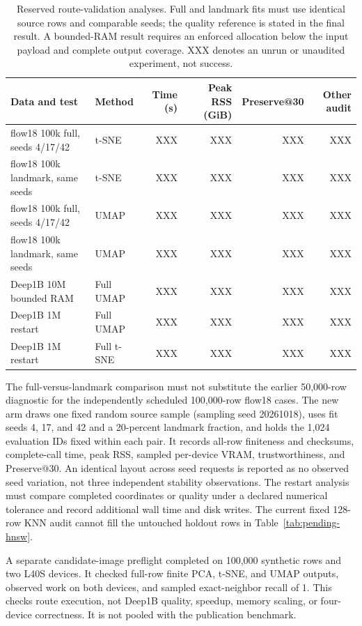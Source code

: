 \documentclass[article]{jss}
\begin{document}
\begin{table}[htbp]
\centering
\scriptsize
\caption{Reserved route-validation analyses. Full and landmark fits must
  use identical source rows and comparable seeds; the quality reference
  is stated in the final result. A bounded-RAM result requires an enforced
  allocation below the input payload and complete output coverage. XXX
  denotes an unrun or unaudited experiment, not success.}
\label{tab:pending-route-validation}
\begin{tabular}{llrrrr}
\toprule
Data and test & Method & Time (s) & Peak RSS (GiB) &
  Preserve@30 & Other audit \\
\midrule
flow18 100k full, seeds 4/17/42 & t-SNE & XXX & XXX & XXX & XXX \\
flow18 100k landmark, same seeds & t-SNE & XXX & XXX & XXX & XXX \\
flow18 100k full, seeds 4/17/42 & UMAP & XXX & XXX & XXX & XXX \\
flow18 100k landmark, same seeds & UMAP & XXX & XXX & XXX & XXX \\
Deep1B 10M bounded RAM & Full UMAP & XXX & XXX & XXX & XXX \\
Deep1B 1M restart & Full UMAP & XXX & XXX & XXX & XXX \\
Deep1B 1M restart & Full t-SNE & XXX & XXX & XXX & XXX \\
\bottomrule
\end{tabular}
\end{table}

The full-versus-landmark comparison must not substitute the earlier
50,000-row diagnostic for the independently scheduled 100,000-row flow18
cases. The new arm draws one fixed random source sample (sampling seed
20261018), uses fit seeds 4, 17, and 42 and a 20-percent landmark
fraction, and holds the 1,024 evaluation IDs fixed within each pair.
It records all-row finiteness and checksums, complete-call time, peak RSS,
sampled per-device VRAM, trustworthiness, and Preserve@30. An identical
layout across seed requests is reported as no observed seed variation,
not three independent stability observations. The restart analysis
must compare completed coordinates or quality under a declared numerical
tolerance and record additional wall time and disk writes. The current
fixed 128-row KNN audit cannot fill the untouched holdout rows in
Table~\ref{tab:pending-hnsw}.

A separate candidate-image preflight completed on 100,000 synthetic rows
and two L40S devices. It checked full-row finite PCA, t-SNE, and UMAP
outputs, observed work on both devices, and sampled exact-neighbor
recall of 1. This checks route execution, not Deep1B quality, speedup,
memory scaling, or four-device correctness. It is not pooled with the
publication benchmark.
\end{document}
